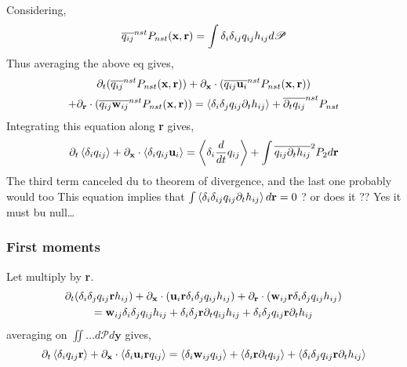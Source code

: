 Considering,
\begin{equation*}
    \overline{q_{ij}}^{nst} P_{nst}(\textbf{x},\textbf{r})= \int\delta_i\delta_{ij} q_{ij} h_{ij} d\mathscr{P} 
\end{equation*}
Thus averaging the above eq gives, 
\begin{multline*}
    \partial_t (\overline{q_{ij}}^{nst} P_{nst}(\textbf{x},\textbf{r})) 
    + \partial_\textbf{x} \cdot ( \overline{q_{ij}\textbf{u}_i}^{nst} P_{nst}(\textbf{x},\textbf{r}))\\
    + \partial_\textbf{r} \cdot ( \overline{q_{ij}\textbf{w}_{ij}}^{nst} P_{nst}(\textbf{x},\textbf{r})) 
    = 
    \left<\delta_i\delta_{j}q_{ij}\partial_t h_{ij} \right>
    + \overline{\partial_t q_{ij}}^{nst}P_{nst}
\end{multline*}
Integrating this equation along \textbf{r} gives, 
\begin{equation}
    \partial_t \left<\delta_i q_{ij}\right> 
    + \partial_\textbf{x} \cdot  \left<\delta_i q_{ij}\textbf{u}_i\right>
    = 
    \left<\delta_i \frac{d}{d t} q_{ij}\right>
    + \int \overline{q_{ij}\partial_t h_{ij}}^{2}P_2d\textbf{r}
\end{equation}
The third term canceled du to theorem of divergence, and the last one probably would too 
This equation implies that $ \int\left<\delta_i\delta_{ij}q_{ij}\partial_t h_{ij} \right>d\textbf{r} =0 $  ? or does it ??
Yes it must bu null\ldots



\subsubsection*{First moments}
Let multiply by \textbf{r}. 
\begin{multline*}
      \partial_t (\delta_i\delta_{j}q_{ij}\textbf{r}h_{ij}) 
    + \partial_\textbf{x} \cdot (\textbf{u}_i \textbf{r}\delta_i\delta_{j}q_{ij}h_{ij})
    + \partial_\textbf{r} \cdot (\textbf{w}_{ij} \textbf{r}\delta_i\delta_{j}q_{ij}h_{ij}) \\
    =  \textbf{w}_{ij} \delta_i\delta_{j}q_{ij}h_{ij}
    + \delta_i\delta_{j}\textbf{r}\partial_t q_{ij}h_{ij} 
    + \delta_i\delta_{j}q_{ij}\textbf{r}\partial_t h_{ij} 
\end{multline*}
averaging on $\iint \ldots d\mathscr{P}d\textbf{y}$ gives, 
\begin{equation*}
      \partial_t \left<\delta_iq_{ij}\textbf{r}\right> 
    + \partial_\textbf{x} \cdot \left<\delta_i\textbf{u}_i \textbf{r}q_{ij}\right>
    = \left<\delta_i\textbf{w}_{ij}q_{ij}\right>
    + \left<\delta_i\textbf{r}\partial_t q_{ij}\right> 
    + \left<\delta_i\delta_{j}q_{ij}\textbf{r}\partial_t h_{ij} \right>
\end{equation*}
